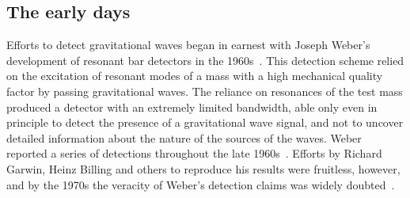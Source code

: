 
\subsection{The early days}
Efforts to detect gravitational waves began in earnest with Joseph Weber's development of resonant bar detectors 
in the 1960s~\cite{Weber_1968}. This detection scheme relied on the excitation of resonant modes of a mass with a high mechanical 
quality factor by passing gravitational waves. The reliance on resonances of the test mass produced a detector 
with an extremely limited bandwidth, able only even in principle to detect the presence of a gravitational wave signal, and not 
to uncover detailed information about the nature of the sources of the waves. 
Weber reported a series of detections throughout the late 1960s~\cite{Weber_1969}. Efforts by Richard Garwin, Heinz Billing and others 
to reproduce his results were fruitless, however, and by the 1970s the veracity of Weber's detection claims was widely doubted~\cite{Garwin_1973, Kafka_1978}. 

